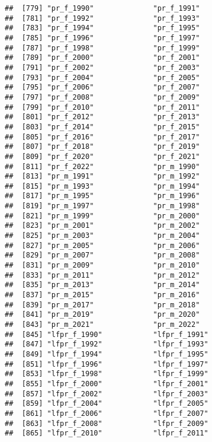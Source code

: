 \documentclass[
]{article}
\begin{document}
\begin{verbatim}
##  [779] "pr_f_1990"              "pr_f_1991"             
##  [781] "pr_f_1992"              "pr_f_1993"             
##  [783] "pr_f_1994"              "pr_f_1995"             
##  [785] "pr_f_1996"              "pr_f_1997"             
##  [787] "pr_f_1998"              "pr_f_1999"             
##  [789] "pr_f_2000"              "pr_f_2001"             
##  [791] "pr_f_2002"              "pr_f_2003"             
##  [793] "pr_f_2004"              "pr_f_2005"             
##  [795] "pr_f_2006"              "pr_f_2007"             
##  [797] "pr_f_2008"              "pr_f_2009"             
##  [799] "pr_f_2010"              "pr_f_2011"             
##  [801] "pr_f_2012"              "pr_f_2013"             
##  [803] "pr_f_2014"              "pr_f_2015"             
##  [805] "pr_f_2016"              "pr_f_2017"             
##  [807] "pr_f_2018"              "pr_f_2019"             
##  [809] "pr_f_2020"              "pr_f_2021"             
##  [811] "pr_f_2022"              "pr_m_1990"             
##  [813] "pr_m_1991"              "pr_m_1992"             
##  [815] "pr_m_1993"              "pr_m_1994"             
##  [817] "pr_m_1995"              "pr_m_1996"             
##  [819] "pr_m_1997"              "pr_m_1998"             
##  [821] "pr_m_1999"              "pr_m_2000"             
##  [823] "pr_m_2001"              "pr_m_2002"             
##  [825] "pr_m_2003"              "pr_m_2004"             
##  [827] "pr_m_2005"              "pr_m_2006"             
##  [829] "pr_m_2007"              "pr_m_2008"             
##  [831] "pr_m_2009"              "pr_m_2010"             
##  [833] "pr_m_2011"              "pr_m_2012"             
##  [835] "pr_m_2013"              "pr_m_2014"             
##  [837] "pr_m_2015"              "pr_m_2016"             
##  [839] "pr_m_2017"              "pr_m_2018"             
##  [841] "pr_m_2019"              "pr_m_2020"             
##  [843] "pr_m_2021"              "pr_m_2022"             
##  [845] "lfpr_f_1990"            "lfpr_f_1991"           
##  [847] "lfpr_f_1992"            "lfpr_f_1993"           
##  [849] "lfpr_f_1994"            "lfpr_f_1995"           
##  [851] "lfpr_f_1996"            "lfpr_f_1997"           
##  [853] "lfpr_f_1998"            "lfpr_f_1999"           
##  [855] "lfpr_f_2000"            "lfpr_f_2001"           
##  [857] "lfpr_f_2002"            "lfpr_f_2003"           
##  [859] "lfpr_f_2004"            "lfpr_f_2005"           
##  [861] "lfpr_f_2006"            "lfpr_f_2007"           
##  [863] "lfpr_f_2008"            "lfpr_f_2009"           
##  [865] "lfpr_f_2010"            "lfpr_f_2011"           

\end{verbatim}
\end{document}
